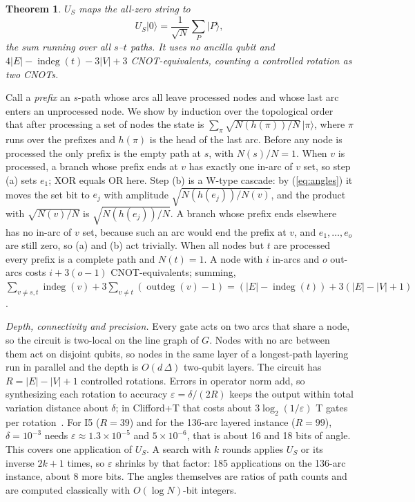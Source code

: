\documentclass[journal]{IEEEtran}
\newtheorem{theorem}{Theorem}
\begin{document}
\begin{theorem}\label{thm:prep}
$U_{S}$ maps the all-zero string to
\begin{equation}
  U_{S}\lvert 0\rangle = \frac{1}{\sqrt{N}}\sum_{P} \lvert P\rangle ,
  \label{eq:prep}
\end{equation}
the sum running over all $s$--$t$ paths. It uses no ancilla qubit and $4|E| - \operatorname{indeg}(t) - 3|V| + 3$ CNOT-equivalents, counting a controlled rotation as two CNOTs.
\end{theorem}

\begin{IEEEproof}
Call a \emph{prefix} an $s$-path whose arcs all leave processed nodes and whose last arc enters an unprocessed node. We show by induction over the topological order that after processing a set of nodes the state is $\sum_{\pi}\sqrt{N(h(\pi))/N}\,\lvert\pi\rangle$, where $\pi$ runs over the prefixes and $h(\pi)$ is the head of the last arc. Before any node is processed the only prefix is the empty path at $s$, with $N(s)/N=1$. When $v$ is processed, a branch whose prefix ends at $v$ has exactly one in-arc of $v$ set, so step (a) sets $e_{1}$; XOR equals OR here. Step (b) is a W-type cascade: by (\ref{eq:angles}) it moves the set bit to $e_{j}$ with amplitude $\sqrt{N(h(e_{j}))/N(v)}$, and the product with $\sqrt{N(v)/N}$ is $\sqrt{N(h(e_{j}))/N}$. A branch whose prefix ends elsewhere has no in-arc of $v$ set, because such an arc would end the prefix at $v$, and $e_{1},\dots,e_{o}$ are still zero, so (a) and (b) act trivially. When all nodes but $t$ are processed every prefix is a complete path and $N(t)=1$. A node with $i$ in-arcs and $o$ out-arcs costs $i + 3(o-1)$ CNOT-equivalents; summing, $\sum_{v\neq s,t}\operatorname{indeg}(v) + 3\sum_{v\neq t}(\operatorname{outdeg}(v)-1) = (|E|-\operatorname{indeg}(t)) + 3(|E|-|V|+1)$.
\end{IEEEproof}

\emph{Depth, connectivity and precision.} Every gate acts on two arcs that share a node, so the circuit is two-local on the line graph of $G$. Nodes with no arc between them act on disjoint qubits, so nodes in the same layer of a longest-path layering run in parallel and the depth is $O(d\,\Delta)$ two-qubit layers. The circuit has $R = |E|-|V|+1$ controlled rotations. Errors in operator norm add, so synthesizing each rotation to accuracy $\varepsilon = \delta/(2R)$ keeps the output within total variation distance about $\delta$; in Clifford+T that costs about $3\log_{2}(1/\varepsilon)$ T gates per rotation~\cite{ross2016}. For I5 ($R=39$) and for the 136-arc layered instance ($R=99$), $\delta=10^{-3}$ needs $\varepsilon\approx 1.3\times10^{-5}$ and $5\times10^{-6}$, that is about 16 and 18 bits of angle. This covers one application of $U_{S}$. A search with $k$ rounds applies $U_{S}$ or its inverse $2k+1$ times, so $\varepsilon$ shrinks by that factor: 185 applications on the 136-arc instance, about 8 more bits. The angles themselves are ratios of path counts and are computed classically with $O(\log N)$-bit integers.
\end{document}
